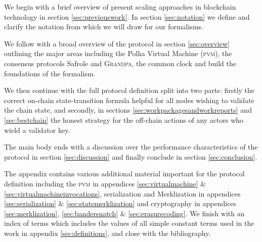 We begin with a brief overview of present scaling approaches in blockchain technology in section \ref{sec:previouswork}. In section \ref{sec:notation} we define and clarify the notation from which we will draw for our formalisms.

We follow with a broad overview of the protocol in section \ref{sec:overview} outlining the major areas including the Polka Virtual Machine (\textsc{pvm}), the consensus protocols Safrole and \textsc{Grandpa}, the common clock and build the foundations of the formalism.

We then continue with the full protocol definition split into two parts: firstly the correct on-chain state-transition formula helpful for all nodes wishing to validate the chain state, and secondly, in sections \ref{sec:workpackagesandworkreports} and \ref{sec:bestchain} the honest strategy for the off-chain actions of any actors who wield a validator key.

The main body ends with a discussion over the performance characteristics of the protocol in section \ref{sec:discussion} and finally conclude in section \ref{sec:conclusion}.

The appendix contains various additional material important for the protocol definition including the \textsc{pvm} in appendices \ref{sec:virtualmachine} \& \ref{sec:virtualmachineinvocations}, serialization and Merklization in appendices \ref{sec:serialization} \& \ref{sec:statemerklization} and cryptography in appendices \ref{sec:merklization}, \ref{sec:bandersnatch} \& \ref{sec:erasurecoding}. We finish with an index of terms which includes the values of all simple constant terms used in the work in appendix \ref{sec:definitions}, and close with the bibliography.